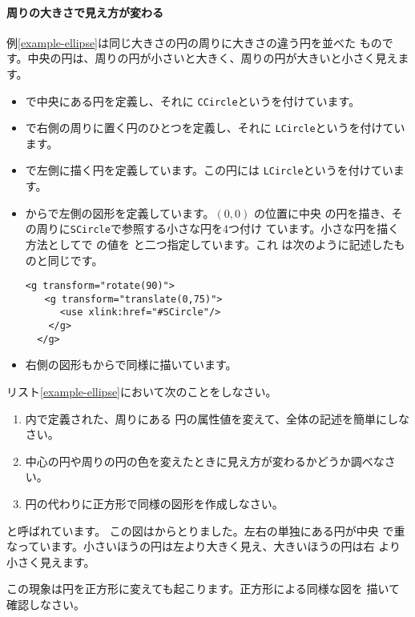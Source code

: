 \paragraph{周りの大きさで見え方が変わる}
例\ref{example-ellipse}は同じ大きさの円の周りに大きさの違う円を並べた
ものです。中央の円は、周りの円が小さいと大きく、周りの円が大きいと小さく見えます。
{}
\begin{itemize}
 \item {}で中央にある円を定義し、それに
       \texttt{CCircle}というを付けています。
 \item {}で右側の周りに置く円のひとつを定義し、それに
       \texttt{LCircle}というを付けています。
 \item {}で左側に描く円を定義しています。この円には
       \texttt{LCircle}というを付けています。
 \item {}からで左側の図形を定義しています。$(0,0)$
       の位置に中央
       の円を描き、その周りに\texttt{SCircle}で参照する小さな円を4つ付け
       ています。小さな円を描く方法としてで
       の値を
       と二つ指定しています。これ
       は次のように記述したものと同じです。
\begin{Verbatim}[fontsize=\small]
  <g transform="rotate(90)">
　　<g transform="translate(0,75)">
      <use xlink:href="#SCircle"/>
    </g>
  </g>
\end{Verbatim}

 \item 右側の図形もからで同様に描いています。
\end{itemize}
\begin{Problem}\upshape
 リスト\ref{example-ellipse}において次のことをしなさい。
\begin{enumerate}
 \item {}内で定義された、周りにある
円の属性値を変えて、全体の記述を簡単にしなさい。
 \item 中心の円や周りの円の色を変えたときに見え方が変わるかどうか調べなさ
 い。
 \item 円の代わりに正方形で同様の図形を作成しなさい。
\end{enumerate}
\end{Problem}
{と呼ばれています。
この図は\cite[131ページ図12.7]{Ninio}からとりました。左右の単独にある円が中央
 で重なっています。小さいほうの円は左より大きく見え、大きいほうの円は右
 より小さく見えます。\par
この現象は円を正方形に変えても起こります。正方形による同様な図を
描いて確認しなさい。}
